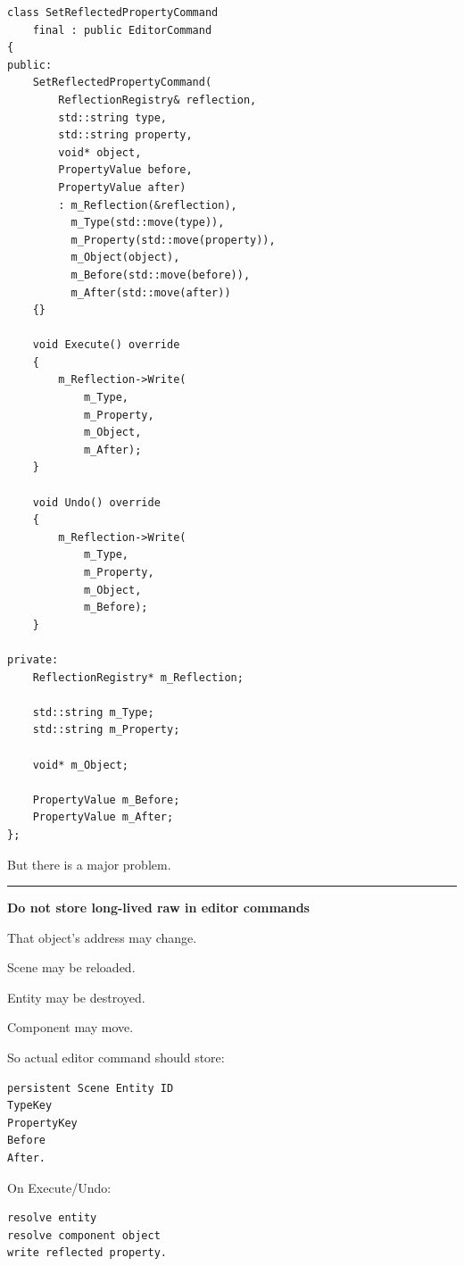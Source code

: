 \begin{verbatim}
class SetReflectedPropertyCommand
    final : public EditorCommand
{
public:
    SetReflectedPropertyCommand(
        ReflectionRegistry& reflection,
        std::string type,
        std::string property,
        void* object,
        PropertyValue before,
        PropertyValue after)
        : m_Reflection(&reflection),
          m_Type(std::move(type)),
          m_Property(std::move(property)),
          m_Object(object),
          m_Before(std::move(before)),
          m_After(std::move(after))
    {}

    void Execute() override
    {
        m_Reflection->Write(
            m_Type,
            m_Property,
            m_Object,
            m_After);
    }

    void Undo() override
    {
        m_Reflection->Write(
            m_Type,
            m_Property,
            m_Object,
            m_Before);
    }

private:
    ReflectionRegistry* m_Reflection;

    std::string m_Type;
    std::string m_Property;

    void* m_Object;

    PropertyValue m_Before;
    PropertyValue m_After;
};
\end{verbatim}

But there is a major problem.

\begin{center}\rule{0.5\linewidth}{0.5pt}\end{center}

\textbf{Do not store long-lived raw  in editor commands}

That object's address may change.

Scene may be reloaded.

Entity may be destroyed.

Component may move.

So actual editor command should store:

\begin{verbatim}
persistent Scene Entity ID
TypeKey
PropertyKey
Before
After.
\end{verbatim}

On Execute/Undo:

\begin{verbatim}
resolve entity
resolve component object
write reflected property.
\end{verbatim}

